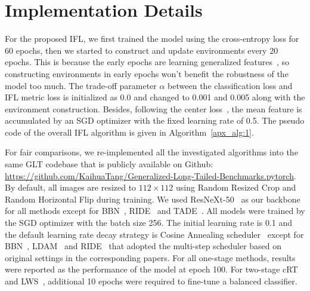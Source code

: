 \documentclass{article}
\begin{document}
\section{Implementation Details} 

For the proposed IFL, we first trained the model using the cross-entropy loss for 60 epochs, then we started to construct and update environments every 20 epochs. This is because the early epochs are learning generalized features~\cite{prechelt1998early,zhang2021understanding}, so constructing environments in early epochs won't benefit the robustness of the model too much. The trade-off parameter $\alpha$ between the classification loss and IFL metric loss is initialized as 0.0 and changed to 0.001 and 0.005 along with the environment construction. Besides, following the center loss~\cite{wen2016centerloss}, the mean feature is accumulated by an SGD optimizer with the fixed learning rate of 0.5. The pseudo code of the overall IFL algorithm is given in Algorithm~\ref{apx_alg:1}. 

For fair comparisons, we re-implemented all the investigated algorithms into the same GLT codebase that is publicly available on Github: \url{https://github.com/KaihuaTang/Generalized-Long-Tailed-Benchmarks.pytorch}. By default, all images are resized to $112 \times 112$ using Random Resized Crop and Random Horizontal Flip during training. We used ResNeXt-50~\cite{xie2017aggregated} as our backbone for all methods except for BBN~\cite{zhou2019bbn}, RIDE~\cite{wang2020long} and TADE~\cite{zhang2021test}. All models were trained by the SGD optimizer with the batch size 256. The initial learning rate is 0.1 and the default learning rate decay strategy is Cosine Annealing scheduler~\cite{loshchilov2016sgdr} except for BBN~\cite{zhou2019bbn}, LDAM~\cite{cao2019ldam} and RIDE~\cite{wang2020long} that adopted the multi-step scheduler based on original settings in the corresponding papers. For all one-stage methods, results were reported as the performance of the model at epoch 100. For two-stage cRT~\cite{kang2019decoupling} and LWS~\cite{kang2019decoupling}, additional 10 epochs were required to fine-tune a balanced classifier. 


    
\end{document}
